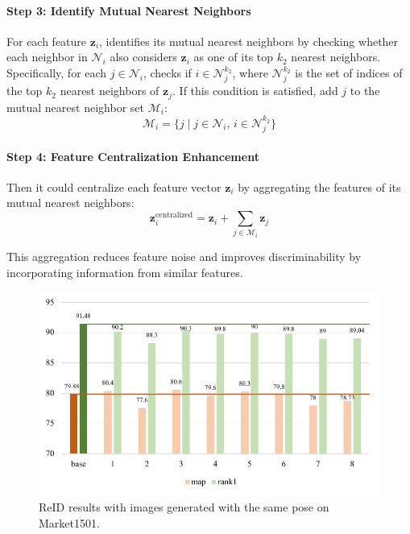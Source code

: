 \paragraph{Step 3: Identify Mutual Nearest Neighbors}

For each feature \(\mathbf{z}_i\), identifies its mutual nearest neighbors by checking whether each neighbor in \(\mathcal{N}_{i}\) also considers \(\mathbf{z}_i\) as one of its top \(k_2\) nearest neighbors. Specifically, for each \(j \in \mathcal{N}_{i}\), checks if \(i \in \mathcal{N}_{j}^{k_2}\), where \(\mathcal{N}_{j}^{k_2}\) is the set of indices of the top \(k_2\) nearest neighbors of \(\mathbf{z}_j\). If this condition is satisfied, add \(j\) to the mutual nearest neighbor set \(\mathcal{M}_{i}\):
\begin{equation}
\mathcal{M}_{i} = \{ j \mid j \in \mathcal{N}_{i}, \, i \in \mathcal{N}_{j}^{k_2} \}
\end{equation}

\paragraph{Step 4: Feature Centralization Enhancement}

Then it could centralize each feature vector \(\mathbf{z}_i\) by aggregating the features of its mutual nearest neighbors:
\begin{equation}
\mathbf{z}_i^{\text{centralized}} = \mathbf{z}_i + \sum_{j \in \mathcal{M}_{i}} \mathbf{z}_j
\end{equation}

This aggregation reduces feature noise and improves discriminability by incorporating information from similar features.

\begin{figure}
\centering
\includegraphics[width=\linewidth]{figs/pdf/samepose.pdf}
\caption{ReID results with images generated with the same pose on Market1501.}
\label{fig:samepose}
\end{figure}

